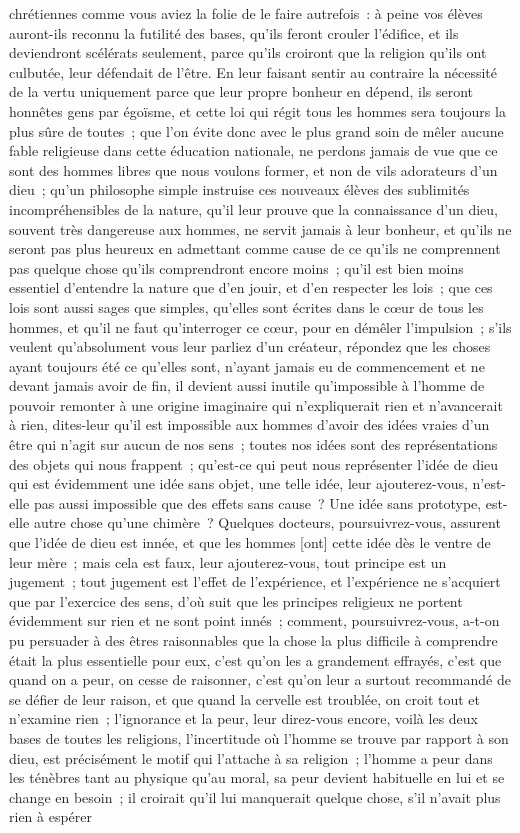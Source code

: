 \documentclass[french,twoside]{book} %
\begin{document}
chrétiennes comme vous aviez la folie de le faire autrefois : à peine vos élèves auront-ils reconnu la futilité des bases, qu’ils feront crouler l’édifice, et ils deviendront scélérats seulement, parce qu’ils croiront que la religion qu’ils ont culbutée, leur défendait de l’être. En leur faisant sentir au contraire la nécessité de la vertu uniquement parce que leur propre bonheur en dépend, ils seront honnêtes gens par égoïsme, et cette loi qui régit tous les hommes sera toujours la plus sûre de toutes ; que l’on évite donc avec le plus grand soin de mêler aucune fable religieuse dans cette éducation nationale, ne perdons jamais de vue que ce sont des hommes libres que nous voulons former, et non de vils adorateurs d’un dieu ; qu’un philosophe simple instruise ces nouveaux élèves des sublimités incompréhensibles de la nature, qu’il leur prouve que la connaissance d’un dieu, souvent très dangereuse aux hommes, ne servit jamais à leur bonheur, et qu’ils ne seront pas plus heureux en admettant comme cause de ce qu’ils ne comprennent pas quelque chose qu’ils comprendront encore moins ; qu’il est bien moins essentiel d’entendre la nature que d’en jouir, et d’en respecter les lois ; que ces lois sont aussi sages que simples, qu’elles sont écrites dans le cœur de tous les hommes, et qu’il ne faut qu’interroger ce cœur, pour en démêler l’impulsion ; s’ils veulent qu’absolument vous leur parliez d’un créateur, répondez que les choses ayant toujours été ce qu’elles sont, n’ayant jamais eu de commencement et ne devant jamais avoir de fin, il devient aussi inutile qu’impossible à l’homme de pouvoir remonter à une origine imaginaire qui n’expliquerait rien et n’avancerait à rien, dites-leur qu’il est impossible aux hommes d’avoir des idées vraies d’un être qui n’agit sur aucun de nos sens ; toutes nos idées sont des représentations des objets qui nous frappent ; qu’est-ce qui peut nous représenter l’idée de dieu qui est évidemment une idée sans objet, une telle idée, leur ajouterez-vous, n’est-elle pas aussi impossible que des effets sans cause ? Une idée sans prototype, est-elle autre chose qu’une chimère ? Quelques docteurs, poursuivrez-vous, assurent que l’idée de dieu est innée, et que les hommes [ont] cette idée dès le ventre de leur mère ; mais cela est faux, leur ajouterez-vous, tout principe est un jugement ; tout jugement est l’effet de l’expérience, et l’expérience ne s’acquiert que par l’exercice des sens, d’où suit que les principes religieux ne portent évidemment sur rien et ne sont point innés ; comment, poursuivrez-vous, a-t-on pu persuader à des êtres raisonnables que la chose la plus difficile à comprendre était la plus essentielle pour eux, c’est qu’on les a grandement effrayés, c’est que quand on a peur, on cesse de raisonner, c’est qu’on leur a surtout recommandé de se défier de leur raison, et que quand la cervelle est troublée, on croit tout et n’examine rien ; l’ignorance et la peur, leur direz-vous encore, voilà les deux bases de toutes les religions, l’incertitude où l’homme se trouve par rapport à son dieu, est précisément le motif qui l’attache à sa religion ; l’homme a peur dans les ténèbres tant au physique qu’au moral, sa peur devient habituelle en lui et se change en besoin ; il croirait qu’il lui manquerait quelque chose, s’il n’avait plus rien à espérer 
\end{document}
